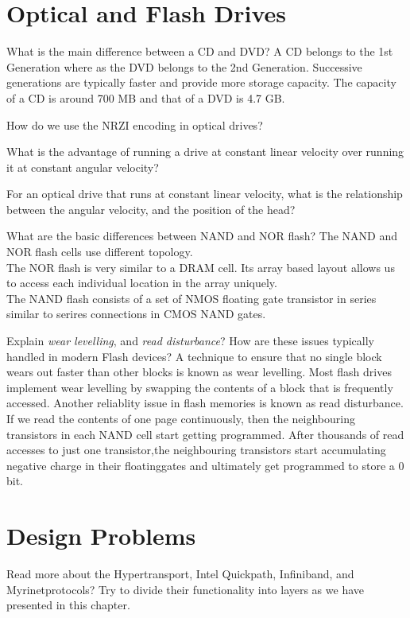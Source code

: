 \section*{Optical and Flash Drives}
\begin{ExerciseList}
\Exercise
What is the main difference between a CD and DVD?
\Answer
A CD belongs to the 1st Generation where as the DVD belongs to the 2nd Generation. Successive generations are typically faster and provide more storage capacity. The capacity of a CD is around 700 MB and that of a DVD is 4.7 GB.

\Exercise
How do we use the NRZI encoding in optical drives?

\Exercise
What is the advantage of running a drive at constant linear velocity over running it at constant angular velocity?

\Exercise[difficulty=1]
For an optical drive that runs at constant linear velocity, what is the relationship between the angular velocity,
and the position of the head?

\Exercise
What are the basic differences between NAND and NOR flash?
\Answer
The NAND and NOR flash cells use different topology.\\
The NOR flash is very similar to a DRAM cell. Its array based layout allows us to access each individual location in the array uniquely.\\
The NAND flash consists of a set of NMOS floating gate transistor in series similar to serires connections in CMOS NAND gates.

\Exercise
Explain {\em wear levelling}, and {\em read disturbance}? How are these issues typically handled in modern Flash devices?
\Answer
A technique to ensure that no single block wears out faster than other blocks is known as wear levelling. Most flash drives implement wear levelling by swapping the contents of a block that is frequently accessed.
Another reliablity issue in flash memories is known as read disturbance. If we read the contents of one page continuously, then the neighbouring transistors in each NAND cell start getting programmed. After thousands of read accesses to just one transistor,the neighbouring transistors start accumulating negative charge in their floatinggates and ultimately get programmed to store a 0 bit. 
\end{ExerciseList}

\section*{Design Problems}

\begin{ExerciseList}

\Exercise
Read more about the Hypertransport\regtm, Intel Quickpath, Infiniband\regtm, and Myrinet\regp protocols? Try to divide their
functionality into layers as we have presented in this chapter.

\end{ExerciseList}
